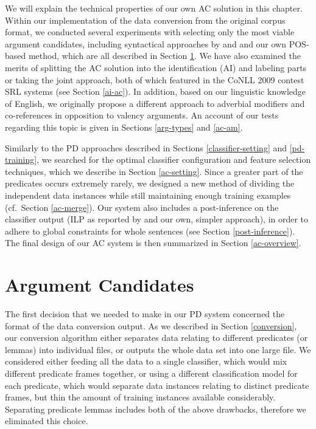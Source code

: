 \documentclass[12pt,notitlepage,a4paper]{report}
\begin{document}
We will explain the technical properties of our own AC solution in this chapter. Within our implementation of the data conversion from the original corpus format, we conducted several experiments with selecting only the most viable argument candidates, including syntactical approaches by \citet{zhao09} and \citet{asahara09} and our own POS-based method, which are all described in Section \ref{pruning}. We have also examined the merits of splitting the AC solution into the identification (AI) and labeling parts or taking the joint approach, both of which featured in the CoNLL 2009 contest SRL systems (see Section \ref{ai-ac}). In addition, based on our linguistic knowledge of English, we originally propose a different approach to adverbial modifiers and co-references in opposition to valency arguments. An account of our tests regarding this topic is given in Sections \ref{arg-types} and \ref{ac-am}.

Similarly to the PD approaches described in Sections \ref{classifier-setting} and \ref{pd-training}, we searched for the optimal classifier configuration and feature selection techniques, which we describe in Section \ref{ac-setting}. Since a greater part of the predicates occurs extremely rarely, we designed a new method of dividing the independent data instances while still maintaining enough training examples (cf.\ Section \ref{ac-merge}). Our system also includes a post-inference on the classifier output (ILP as reported by \citet{punyakanok04} and our own, simpler approach), in order to adhere to global constraints for whole sentences (see Section \ref{post-inference}). The final design of our AC system is then summarized in Section \ref{ac-overview}.

\section{Argument Candidates}\label{pruning}

The first decision that we needed to make in our PD system concerned the format of the data conversion output. As we described in Section \ref{conversion}, our conversion algorithm either separates data relating to different predicates (or lemmas) into individual files, or outputs the whole data set into one large file. We considered either feeding all the data to a single classifier, which would mix different predicate frames together, or using a different classification model for each predicate, which would separate data instances relating to distinct predicate frames, but thin the amount of training instances available considerably. Separating predicate lemmas includes both of the above drawbacks, therefore we eliminated this choice.
\end{document}
